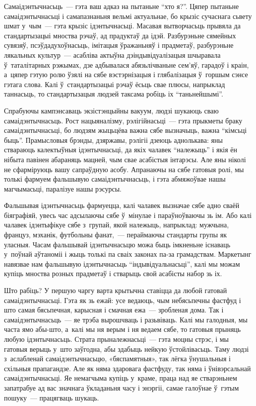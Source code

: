 Самаідэнтычнасьць~--- гэта ваш адказ на пытаньне ``хто я?''. Цяпер пытаньне самаідэнтычнасьці і самапазнаньня вельмі актуальнае, бо крызіс сучаснага сьвету шмат у~чым~--- гэта крызіс ідэнтычнасьці. Масавая вытворчасьць прывяла да стандартызацыі мноства рэчаў, ад прадуктаў да ідэй. Разбурэньне сямейных сувязяў, псэўдадухоўнасьць, імітацыя ўражаньняў і прадметаў, разбурэньне лякальных культур~--- асабліва актыўна дэіндывідуалізацыя шчыравала ў~таталітарных рэжымах, дзе адбывалася абязьлічваньне сем'яў, гарадоў і краін, а~цяпер гэтую ролю ўзялі на сябе вэстэрнізацыя і глябалізацыя ў~горшым сэнсе гэтага слова. Калі ў~стандартызацыі рэчаў ёсьць свае плюсы, напрыклад таннасьць, то стандартызацыя людзей таксама робіць іх ``таньнейшымі''.

Спрабуючы кампэнсаваць экзістэнцыйны вакуум, людзі шукаюць сваю самаідэнтычнасьць. Рост нацыяналізму, рэлігійнасьці~--- гэта прыкметы браку самаідэнтычнасьці, бо людзям жыцьцёва важна сябе вызначыць, важна ``кімсьці быць''. Прамысловыя брэнды, дзяржавы, рэлігіі дзеюць аднолькава: яны ствараюць калектыўныя ідэнтычнасьці, да якіх чалавек ``належыць'' і якія ён нібыта павінен абараняць мацней, чым свае асабістыя інтарэсы. Але яны ніколі не сфарміруюць вашу сапраўдную асобу. Апранаючы на сябе гатовыя ролі, мы толькі фармуем фальшывую самаідэнтычнасьць, і гэта абмяжоўвае нашы магчымасьці, паралізуе нашы рэсурсы.

Фальшывая ідэнтычнасьць фармуецца, калі чалавек вызначае сябе адно сваёй біяграфіяй, увесь час адсылаючы сябе ў~мінулае і параўноўваючы зь ім. Або калі чалавек ідэнтыфікуе сябе з~групай, якой належыць, напрыклад: мужчына, француз, мэханік, футбольны фанат,~--- пераймаючы стандарты групы як уласныя. Часам фальшывай ідэнтычнасьцю можа быць імкненьне існаваць у~поўнай аўтаноміі і жыць толькі па сваіх законах па-за грамадствам. Маркетынг навязвае нам фальшывую ідэнтычнасьць ``індывідуальнасьці'', калі мы можам купіць мноства розных прадметаў і стварыць свой асабісты набор зь іх.

Што рабіць? У першую чаргу варта крытычна ставіцца да любой гатовай самаідэнтычнасьці. Гэта як зь ежай: усе ведаюць, чым небясьпечны фастфуд і што самая бясьпечная, карысная і смачная ежа~--- зробленая дома. Так і самаідэнтычнасьць~--- яе трэба вырошчваць і разьвіваць. Калі мы галодныя, мы часта ямо абы-што, а~калі мы ня верым і ня ведаем сябе, то гатовыя прыняць любую ідэнтычнасьць. Страта прыналежнасьці~--- гэта моцны стрэс, і мы гатовыя верыць у~што заўгодна, абы здабыць нейкую ўстойлівасьць. Таму людзі з~аслабленай самаідэнтычнасьцю, «бяспамятныя», так лёгка ўнушальныя і схільныя прапагандзе. Але як няма здаровага фастфуду, так няма і ўнівэрсальнай самаідэнтычнасьці. Яе немагчыма купіць у~краме, праца над яе стварэньнем запатрабуе ад вас значнага ўкладаньня часу і энэргіі, самае галоўнае ў~гэтым пошуку~--- працягваць шукаць.

